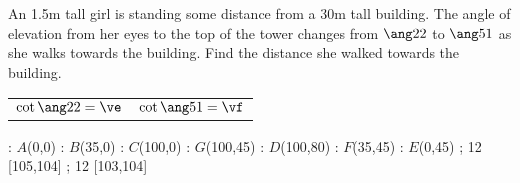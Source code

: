 

\DEGREESCOT\va\vc
\DEGREESCOT\vb\vd
\ROUND[2]\vc\ve
\ROUND[2]\vd\vf

\SUBTRACT\ve\vf\vg
\MULTIPLY{}\vh
\ROUND[2]\vh\vi

\question[3] An 1.5m tall girl is standing some distance from a 30m tall building.
The angle of elevation from her eyes to the top of the tower changes from $\ang\va$
to $\ang\vb$ as she walks towards the building. Find the distance she walked towards the building.

\watchout 

\begin{calcaid}
  \begin{tabular}{c c}
    $\cot\ang\va=\ve$ & $\cot\ang\vb=\vf$ 
  \end{tabular}
\end{calcaid}

\ifprintanswers
    \vspace{0.7cm}
      : $A$(0,0)
      : $B$(35,0)
      : $C$(100,0)
      : $G$(100,45)
      : $D$(100,80)
      : $F$(35,45)
      : $E$(0,45)
    \figdrawbegin{}
      \figdrawline [100,101,102,103,105,106,100]
      \figdrawline [101,105,104,106]
      \figdrawline [103,104]
       ; 12 [105,104] 
       ; 12 [103,104] 
    \figdrawend
    \centerline{\box\figBoxA}
\fi 

